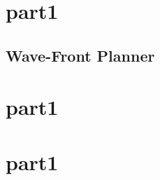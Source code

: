 \appendices
\section{part1}
\subsection{Wave-Front Planner}
\label{app:wave}




\section{part1}
\section{part1}
